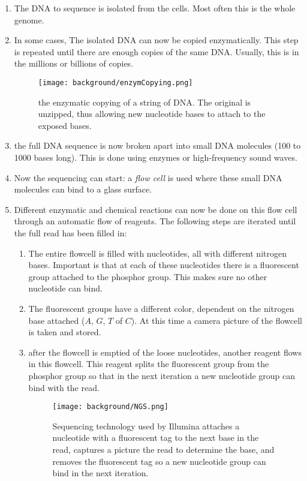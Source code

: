 \begin{enumerate}
	\item The DNA to sequence is isolated from the cells. Most often this is the whole genome.
	\item  In some cases, The isolated DNA can now be copied enzymatically. This step is repeated until there are enough copies of the same DNA. Usually, this is in the millions or billions of copies.
	
	\begin{figure}[H]
		\centering
		\texttt{[image: background/enzymCopying.png]}
		\caption{the enzymatic copying of a string of DNA. The original is unzipped, thus allowing new nucleotide bases to attach to the exposed bases.}
		\label{fig:enzymCopying}
	\end{figure}
	
	\item the full DNA sequence is now broken apart into small DNA molecules (100 to 1000 bases long). This is done using enzymes or high-frequency sound waves.
	\item Now the sequencing can start: a \emph{flow cell} is used where these small DNA molecules can bind to a glass surface. 
	\item Different enzymatic and chemical reactions can now be done on this flow cell through an automatic flow of reagents. The following steps are iterated until the full read has been filled in:
	\begin{enumerate}
		\item The entire flowcell is filled with nucleotides, all with different nitrogen bases. Important is that at each of these nucleotides there is a fluorescent group attached to the phosphor group. This makes sure no other nucleotide can bind.
		\item The fluorescent groups have a different color, dependent on the nitrogen base attached ($A$, $G$, $T$ of $C$). At this time a camera picture of the flowcell is taken and stored.
		\item after the flowcell is emptied of the loose nucleotides, another reagent flows in this flowcell. This reagent splits the fluorescent group from the phosphor group so that in the next iteration a new nucleotide group can bind with the read.
		
		\begin{figure}[H]
			\centering
			\texttt{[image: background/NGS.png]}
			\caption{Sequencing technology used by Illumina attaches a nucleotide with a fluorescent tag to the next base in the read, captures a picture the read to determine the base, and removes the fluorescent tag so a new nucleotide group can bind in the next iteration.}
			\label{fig:NGS}
		\end{figure}
	\end{enumerate}
	

\end{enumerate}
